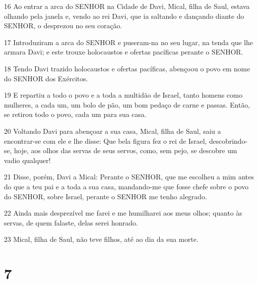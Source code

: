 \par 16 Ao entrar a arca do SENHOR na Cidade de Davi, Mical, filha de Saul, estava olhando pela janela e, vendo ao rei Davi, que ia saltando e dançando diante do SENHOR, o desprezou no seu coração.
\par 17 Introduziram a arca do SENHOR e puseram-na no seu lugar, na tenda que lhe armara Davi; e este trouxe holocaustos e ofertas pacíficas perante o SENHOR.
\par 18 Tendo Davi trazido holocaustos e ofertas pacíficas, abençoou o povo em nome do SENHOR dos Exércitos.
\par 19 E repartiu a todo o povo e a toda a multidão de Israel, tanto homens como mulheres, a cada um, um bolo de pão, um bom pedaço de carne e passas. Então, se retirou todo o povo, cada um para sua casa.
\par 20 Voltando Davi para abençoar a sua casa, Mical, filha de Saul, saiu a encontrar-se com ele e lhe disse: Que bela figura fez o rei de Israel, descobrindo-se, hoje, aos olhos das servas de seus servos, como, sem pejo, se descobre um vadio qualquer!
\par 21 Disse, porém, Davi a Mical: Perante o SENHOR, que me escolheu a mim antes do que a teu pai e a toda a sua casa, mandando-me que fosse chefe sobre o povo do SENHOR, sobre Israel, perante o SENHOR me tenho alegrado.
\par 22 Ainda mais desprezível me farei e me humilharei aos meus olhos; quanto às servas, de quem falaste, delas serei honrado.
\par 23 Mical, filha de Saul, não teve filhos, até ao dia da sua morte.

\chapter{7}

